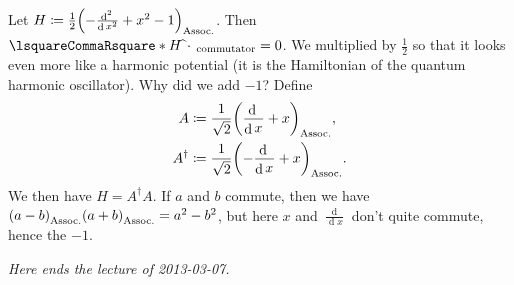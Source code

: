 \documentclass[10pt]{article}
\DeclarePairedDelimiter\parentheses{\lparen}{\rparen}
\DeclareMathOperator{\diffd}{d}
\newcommand\ft\widehat
\newcommand{\adj}{^\dagger}
\newcommand\deriv[3][]{\frac{\diffd^{#1} {#3}}{{\diffd {#2}}^{#1}}}
\newcommand{\derivop}[2][]{\deriv[#1]{#2}{}}
\newcommand\pa[1]{\parentheses*{#1}}
\newcommand\commutator[2]{\lsquareCommaRsquare*{#1}{#2}}
\newcommand\placeholder{\,\:\cdot\:\,}
\renewcommand\pa[1]{\parentheses*{#1}_\mathrm{Assoc.}}
\renewcommand\commutator[2]{\lsquareCommaRsquare*{#1}{#2}_{\mathrm{commutator}}}
\newcommand{\lectureEnd}[1]{

\emph{Here ends the lecture of #1.}

}
\begin{document}
  Let $H \coloneqq \frac{1}{2}\pa{-\derivop[2]{x}+x^2-1}$. Then $\commutator H {\ft\placeholder}=0$. We multiplied by $\frac{1}{2}$ so that it looks even more like a harmonic potential (it is the Hamiltonian of the quantum harmonic oscillator). Why did we add $-1$? Define
  \begin{align*}
    A &\coloneqq \frac{1}{\sqrt 2}\pa{\derivop{x} + x},\\
    A\adj &\coloneqq \frac{1}{\sqrt 2}\pa{-\derivop{x} + x}.
  \end{align*}
  We then have $H = A\adj A$. If $a$ and $b$ commute, then we have $\pa{a-b}\pa{a+b}  = a^2-b^2$, but here $x$ and $\derivop{x}$ don't quite commute, hence the $-1$.
\lectureEnd{2013-03-07}
\end{document}
